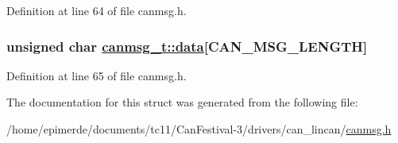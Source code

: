 Definition at line 64 of file canmsg.h.\hypertarget{structcanmsg__t_778d41b22a1ae1f0da4631885239a10c}{
\subsubsection[data]{\setlength{\rightskip}{0pt plus 5cm}unsigned char \hyperlink{structcanmsg__t_778d41b22a1ae1f0da4631885239a10c}{canmsg\_\-t::data}\mbox{[}CAN\_\-MSG\_\-LENGTH\mbox{]}}}
\label{structcanmsg__t_778d41b22a1ae1f0da4631885239a10c}




Definition at line 65 of file canmsg.h.

The documentation for this struct was generated from the following file:\begin{CompactItemize}
\item 
/home/epimerde/documents/tc11/Can\-Festival-3/drivers/can\_\-lincan/\hyperlink{canmsg_8h}{canmsg.h}\end{CompactItemize}
